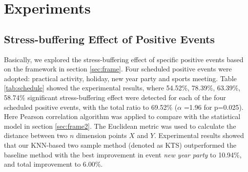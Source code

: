 \section{Experiments}
\subsection{Stress-buffering Effect of Positive Events}
\label{subsec:experiment}
\begin{table}[h]
\begin{center}
\caption{\small{Quantify the stress-buffering effect of scheduled positive events applying KTS model (the KNN-based two sample method adopted in this research) and baseline method.}}
\label{tab:schedule}
\end{center}
\end{table}
Basically, we explored the stress-buffering effect of specific positive events based on the framework in section \ref{sec:frame}.
Four scheduled positive events were adopted:
practical activity, holiday, new year party and sports meeting.
Table \ref{tab:schedule} showed the experimental results,
where 54.52\%, 78.39\%, 63.39\%, 58.74\% significant stress-buffering effect were detected for
each of the four scheduled positive events, with the total ratio to 69.52\% ($\alpha$ =1.96 for p=0.025).
Here Pearson correlation algorithm was applied to compare with the statistical model in section \ref{sec:frame2}.
The Euclidean metric was used to calculate the distance between two $n$ dimension points $X$ and $Y$.
Experimental results showed that our KNN-based two sample method (denoted as KTS) outperformed the baseline method
with the best improvement in event \emph{new year party} to 10.94\%, and total improvement to 6.00\%.

